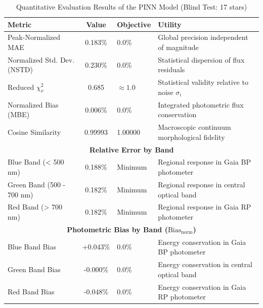
\begin{table}[htpb]
\centering
\caption{Quantitative Evaluation Results of the PINN Model (Blind Test: 17 stars)}
\label{tab:pinn_evaluation}
\begin{tabular}{lcll}
\hline
\textbf{Metric} & \textbf{Value} & \textbf{Objective} & \textbf{Utility} \\
\hline
Peak-Normalized MAE & 0.183\% & 0.0\% & Global precision independent of magnitude \\
Normalized Std. Dev. (NSTD) & 0.230\% & 0.0\% & Statistical dispersion of flux residuals \\
Reduced $\chi^2_\nu$ & 0.685 & $\approx 1.0$ & Statistical validity relative to noise $\sigma_i$ \\
Normalized Bias (MBE) & 0.006\% & 0.0\% & Integrated photometric flux conservation \\
Cosine Similarity & 0.99993 & 1.00000 & Macroscopic continuum morphological fidelity \\
\hline
\multicolumn{4}{c}{\textbf{Relative Error by Band}} \\
\hline
Blue Band (< 500 nm) & 0.188\% & Minimum & Regional response in Gaia BP photometer \\
Green Band (500 - 700 nm) & 0.182\% & Minimum & Regional response in central optical band \\
Red Band (> 700 nm) & 0.182\% & Minimum & Regional response in Gaia RP photometer \\
\hline
\multicolumn{4}{c}{\textbf{Photometric Bias by Band ($\text{Bias}_{\text{norm}}$)}} \\
\hline
Blue Band Bias & +0.043\% & 0.0\% & Energy conservation in Gaia BP photometer \\
Green Band Bias & -0.000\% & 0.0\% & Energy conservation in central optical band \\
Red Band Bias & -0.048\% & 0.0\% & Energy conservation in Gaia RP photometer \\
\hline
\end{tabular}
\end{table}
